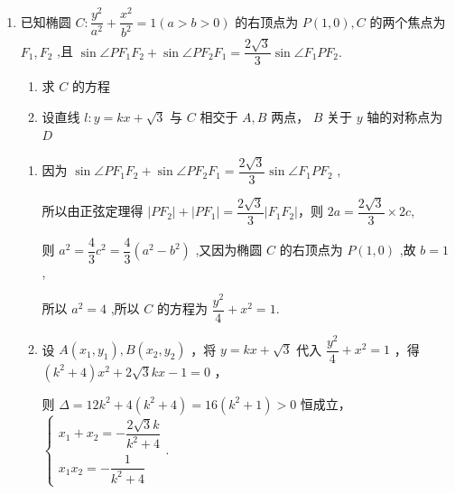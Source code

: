 \begin{enumerate}
    \item 已知椭圆 $C : \dfrac{{y}^{2}}{{a}^{2}} + \dfrac{{x}^{2}}{{b}^{2}} = 1\left( {a > b > 0}\right)$ 的右顶点为 $P\left( {1,0}\right) ,C$ 的两个焦点为 ${F}_{1},{F}_{2}$ ,且 $\sin \angle P{F}_{1}{F}_{2} + \sin \angle P{F}_{2}{F}_{1} = \dfrac{2\sqrt{3}}{3}\sin \angle {F}_{1}P{F}_{2}.$
    \begin{enumerate}
        \item 求 $C$ 的方程
        \item 设直线 $l : y = {kx} + \sqrt{3}$ 与 $C$ 相交于 $A,B$ 两点， $B$ 关于 $y$ 轴的对称点为 $D$
    \end{enumerate}
    \begin{jieda}
        \begin{enumerate}
            \item 因为 $\sin \angle P{F}_{1}{F}_{2} + \sin \angle P{F}_{2}{F}_{1} = \dfrac{2\sqrt{3}}{3}\sin \angle {F}_{1}P{F}_{2}$ ,

            所以由正弦定理得 $\left| {P{F}_{2}}\right|  + \left| {P{F}_{1}}\right|  = \dfrac{2\sqrt{3}}{3}\left| {{F}_{1}{F}_{2}}\right|$，则 ${2a} = \dfrac{2\sqrt{3}}{3} \times  {2c},$

            则 ${a}^{2} = \dfrac{4}{3}{c}^{2} = \dfrac{4}{3}\left( {{a}^{2} - {b}^{2}}\right)$ ,又因为椭圆 $C$ 的右顶点为 $P\left( {1,0}\right)$ ,故 $b = 1$ ,

            所以 ${a}^{2} = 4$ ,所以 $C$ 的方程为 $\dfrac{{y}^{2}}{4} + {x}^{2} = 1$.

            \item 设 $A\left( {{x}_{1},{y}_{1}}\right) ,B\left( {{x}_{2},{y}_{2}}\right)$ ，将 $y = {kx} + \sqrt{3}$ 代入 $\dfrac{{y}^{2}}{4} + {x}^{2} = 1$ ，得 $\left( {{k}^{2} + 4}\right) {x}^{2} + {2\sqrt{3}}{kx} - 1 = 0$ ，

            则 $\Delta  = {12}{k}^{2} + 4\left( {{k}^{2} + 4}\right)  = {16}\left( {{k}^{2} + 1}\right)  > 0$ 恒成立，$\left\{\begin{array}{l}
                {x}_{1} + {x}_{2} =  - \dfrac{2\sqrt{3}k}{{k}^{2} + 4} \\
                {x}_{1}{x}_{2} =  - \dfrac{1}{{k}^{2} + 4}
            \end{array}\right. $.
\end{enumerate}
\end{jieda}
\end{enumerate}
